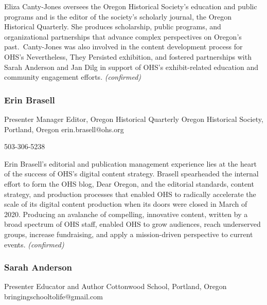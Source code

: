 \documentclass{report}
\begin{document}
                Eliza Canty-Jones oversees the Oregon Historical Society’s education and public programs and is the editor of the society’s scholarly journal, the Oregon Historical Quarterly. She produces scholarship, public programs, and organizational partnerships that advance complex perspectives on Oregon’s past. Canty-Jones was also involved in the content development process for OHS’s Nevertheless, They Persisted exhibition, and fostered partnerships with Sarah Anderson and Jan Dilg in support of OHS’s exhibit-related education and community engagement efforts.\newline
                \emph{ (confirmed) }
              

              
                \subsubsection*{ Erin Brasell }
                Presenter\newline
                Manager Editor, Oregon Historical Quarterly\newline
                Oregon Historical Society, Portland, Oregon
                \newline
                erin.brasell@ohs.org\newline
                
                503-306-5238\newline

                Erin Brasell’s editorial and publication management experience lies at the heart of the success of OHS’s digital content strategy. Brasell spearheaded the internal effort to form the OHS blog, Dear Oregon, and the editorial standards, content strategy, and production processes that enabled OHS to radically accelerate the scale of its digital content production when its doors were closed in March of 2020. Producing an avalanche of compelling, innovative content, written by a broad spectrum of OHS staff, enabled OHS to grow audiences, reach underserved groups, increase fundraising, and apply a mission-driven perspective to current events.
                \emph{ (confirmed) }
              

              
                \subsubsection*{ Sarah Anderson }
                Presenter\newline
                Educator and Author\newline
                Cottonwood School, Portland, Oregon
                \newline
                bringingschooltolife@gmail.com\newline
                
\end{document}
